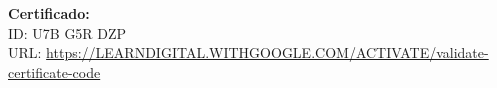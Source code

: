 \begin{entrylist}
{		    \textbf{Certificado:} \\
		    ID: U7B G5R DZP \\
		    URL: {\href{https://LEARNDIGITAL.WITHGOOGLE.COM/ACTIVATE/validate-certificate-code}{https://LEARNDIGITAL.WITHGOOGLE.COM/ACTIVATE/validate-certificate-code}}
		}
\end{entrylist}